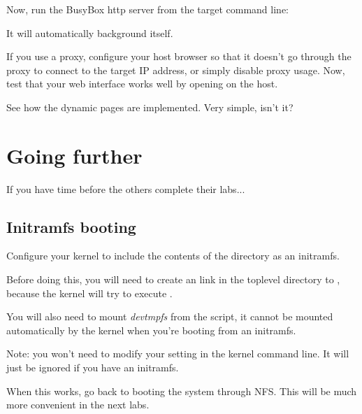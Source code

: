 Now, run the BusyBox http server from the target command line:


It will automatically background itself.

If you use a proxy, configure your host browser so that it doesn't go
through the proxy to connect to the target IP address, or simply
disable proxy usage.  Now, test that your web interface works well by
opening  on the host.

See how the dynamic pages are implemented. Very simple, isn't it?

\section{Going further}

If you have time before the others complete their labs...

\subsection{Initramfs booting}

Configure your kernel to include the contents of the 
directory as an initramfs.

Before doing this, you will need to create an  link in the
toplevel directory to , because the kernel will try to
execute .

You will also need to mount {\em devtmpfs} from the  script,
it cannot be mounted automatically by the kernel when you're booting
from an initramfs.

Note: you won't need to modify your  setting in the kernel
command line. It will just be ignored if you have an initramfs.

When this works, go back to booting the system through NFS.
This will be much more convenient in the next labs.
